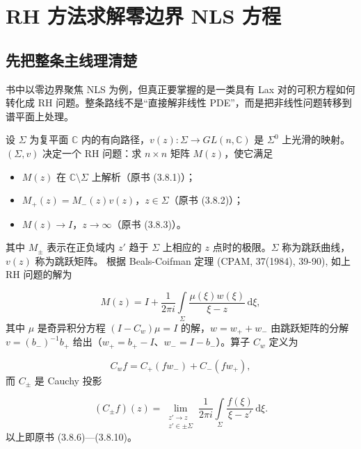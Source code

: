 \documentclass[
    lang=cn,
    scheme=chinese,
    mode=simple,
    device=normal,
    color=blue,
    math=cm,
    thmcnt=section,
    12pt,
    nowatermark
]{elegantbook}
\begin{document}
\setcounter{chapter}{4}

\chapter{RH 方法求解零边界 NLS 方程}

\section*{先把整条主线理清楚}

书中以零边界聚焦 NLS 为例，但真正要掌握的是一类具有 Lax 对的可积方程如何转化成 RH 问题。整条路线不是``直接解非线性 PDE''，而是把非线性问题转移到谱平面上处理。

\begin{callout}
    设 $\Sigma$ 为复平面 $\mathbb{C}$ 内的有向路径，$v(z):\Sigma\to GL(n,\mathbb{C})$ 是 $\Sigma^0$ 上光滑的映射。
    $(\Sigma,v)$ 决定一个 RH 问题：求 $n\times n$ 矩阵 $M(z)$，使它满足

    \begin{itemize}
        \item $M(z)$ 在 $\mathbb{C}\setminus\Sigma$ 上解析（原书 (3.8.1)）；
        \item $M_+(z)=M_-(z)v(z)$，$z\in\Sigma$（原书 (3.8.2)）；
        \item $M(z)\to I$，$z\to\infty$（原书 (3.8.3)）。
    \end{itemize}

    其中 $M_\pm$ 表示在正负域内 $z'$ 趋于 $\Sigma$ 上相应的 $z$ 点时的极限。$\Sigma$ 称为跳跃曲线，$v(z)$ 称为跳跃矩阵。
    根据 Beals-Coifman 定理 (CPAM, 37(1984), 39-90), 如上 RH 问题的解为

    \[
        M(z)
        =
        I+\dfrac{1}{2\pi i}\int\limits_\Sigma\dfrac{\mu(\xi)w(\xi)}{\xi-z}\,\mathrm d\xi,
    \]
    其中 $\mu$ 是奇异积分方程 $(I-C_w)\mu=I$ 的解，$w=w_++w_-$ 由跳跃矩阵的分解 $v=(b_-)^{-1}b_+$ 给出（$w_+=b_+-I$、$w_-=I-b_-$）。算子 $C_w$ 定义为

    \[
        C_wf=C_+(fw_-)+C_-(fw_+),
    \]
    而 $C_\pm$ 是 Cauchy 投影

    \[
        (C_\pm f)(z)=\lim\limits_{\substack{z'\to z\\ z'\in\pm\Sigma}}\dfrac{1}{2\pi i}\int\limits_\Sigma\dfrac{f(\xi)}{\xi-z'}\,\mathrm d\xi.
    \]
    以上即原书 (3.8.6)---(3.8.10)。
\end{callout}
\end{document}
